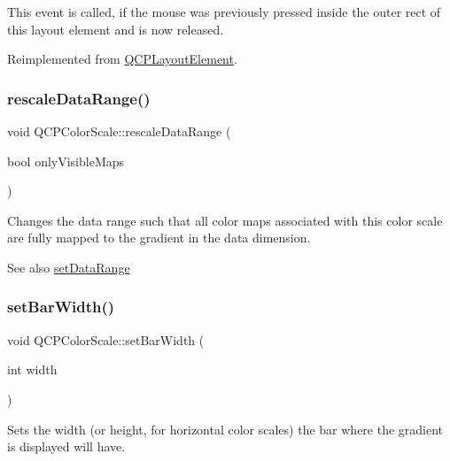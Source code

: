 This event is called, if the mouse was previously pressed inside the outer rect of this layout element and is now released. 

Reimplemented from \mbox{\hyperlink{class_q_c_p_layout_element_ae526ac828cce1e5bb94eaa85776d7404}{Q\+C\+P\+Layout\+Element}}.

\mbox{\label{class_q_c_p_color_scale_a425983db4478543924ddbd04ea20a356}} 
\subsubsection{\texorpdfstring{rescale\+Data\+Range()}{rescaleDataRange()}}
{\footnotesize\ttfamily void Q\+C\+P\+Color\+Scale\+::rescale\+Data\+Range (\begin{DoxyParamCaption}\item[{bool}]{only\+Visible\+Maps }\end{DoxyParamCaption})}

Changes the data range such that all color maps associated with this color scale are fully mapped to the gradient in the data dimension.

\begin{DoxySeeAlso}{See also}
\mbox{\hyperlink{class_q_c_p_color_scale_abe88633003a26d1e756aa74984587fef}{set\+Data\+Range}} 
\end{DoxySeeAlso}
\mbox{\label{class_q_c_p_color_scale_ab9dcc0c1cd583477496209b1413bcb99}} 
\subsubsection{\texorpdfstring{set\+Bar\+Width()}{setBarWidth()}}
{\footnotesize\ttfamily void Q\+C\+P\+Color\+Scale\+::set\+Bar\+Width (\begin{DoxyParamCaption}\item[{int}]{width }\end{DoxyParamCaption})}

Sets the width (or height, for horizontal color scales) the bar where the gradient is displayed will have. \mbox{\label{class_q_c_p_color_scale_abe88633003a26d1e756aa74984587fef}} 
